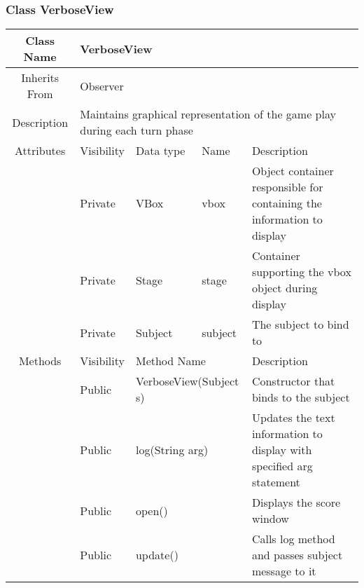 \subsubsection{Class VerboseView}
\begin{tabularx}{\textwidth}{|c||l|l|l|X|}
    \hline
    \cellcolor{lightgray}Class Name & \multicolumn{4}{X|}{VerboseView}\\
    \hline
    \cellcolor{lightgray}Inherits From & \multicolumn{4}{X|}{Observer}\\
    \hline
    \cellcolor{lightgray}Description & \multicolumn{4}{p{12cm}|}{Maintains graphical representation of the game play during each turn phase}\\
    \hline\hline
    
    \cellcolor{lightgray}Attributes & \cellcolor{lightgray}Visibility & \cellcolor{lightgray}Data type & \cellcolor{lightgray}Name & \cellcolor{lightgray}Description\\\cline{2-5}
    \cellcolor{lightgray} & Private & VBox & vbox & Object container responsible for containing the information to display\\\cline{2-5}
    \cellcolor{lightgray} & Private & Stage & stage & Container supporting the vbox object during display \\\cline{2-5}
    \cellcolor{lightgray} & Private & Subject & subject & The subject to bind to\\
    \hline\hline
    
    \cellcolor{lightgray}Methods & \cellcolor{lightgray}Visibility & \multicolumn{2}{l|}{\cellcolor{lightgray}Method Name} & \cellcolor{lightgray}Description\\\cline{2-5}
    \cellcolor{lightgray} & Public & \multicolumn{2}{l|}{VerboseView(Subject s)} & Constructor that binds to the subject\\\cline{2-5}
    \cellcolor{lightgray} & Public & \multicolumn{2}{l|}{log(String arg)} & Updates the text information to display with specified arg statement\\\cline{2-5}
    \cellcolor{lightgray} & Public & \multicolumn{2}{l|}{open()} & Displays the score window\\\cline{2-5}
    \cellcolor{lightgray} & Public & \multicolumn{2}{l|}{update()} & Calls log method and passes subject message to it\\
    \hline
\end{tabularx}